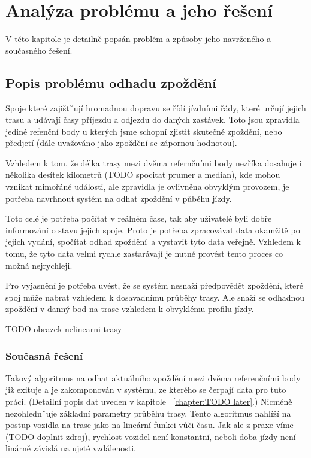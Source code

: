 
\chapter{Analýza problému a jeho řešení}

V této kapitole je detailně popsán problém a způsoby jeho navrženého a současného řešení.

\section{Popis problému odhadu zpoždění}

Spoje které zajištˇují hromadnou dopravu se řídí jízdními řády, které určují jejich trasu a udávají časy příjezdu a odjezdu do daných zastávek. Toto jsou zpravidla jediné refenční body u kterých jsme schopní zjistit skutečné zpoždění, nebo předjetí (dále uvažováno jako zpoždění se zápornou hodnotou).

\bigbreak

Vzhledem k tom, že délka trasy mezi dvěma refernčními body nezříka dosahuje i několika desítek kilometrů (TODO spocitat prumer a median), kde mohou vznikat mimořáné události, ale zpravidla je ovlivněna obvyklým provozem, je potřeba navrhnout systém na odhat zpoždění v půběhu jízdy.

\bigbreak

Toto celé je potřeba počítat v reálném čase, tak aby uživatelé byli dobře informování o stavu jejich spoje. Proto je potřeba zpracovávat data okamžitě po jejich vydání, spočítat odhad zpoždění a vystavit tyto data veřejně. Vzhledem k tomu, že tyto data velmi rychle zastarávají je nutné provést tento proces co možná nejrychleji.

\bigbreak

Pro vyjasnění je potřeba uvést, že se systém nesnaží předpovědět zpoždění, které spoj může nabrat vzhledem k dosavadnímu průběhy trasy. Ale snaží se odhadnou zpoždění v danný bod na trase vzhledem k obvyklému profilu jízdy.

TODO obrazek nelinearni trasy

\subsection{Současná řešení}

Takový algoritmus na odhat aktuálního zpoždění mezi dvěma referenčními body již exituje a je zakomponován v systému, ze kterého se čerpají data pro tuto práci. (Detailní popis dat uveden v kapitole ~\ref{chapter:TODO later}.) Nicméně nezohlednˇuje základní parametry průběhu trasy. Tento algoritmus nahlíží na postup vozidla na trase jako na lineární funkci vůči času. Jak ale z praxe víme (TODO doplnit zdroj), rychlost vozidel není konstantní, neboli doba jízdy není linárně závislá na ujeté vzdálenosti.


